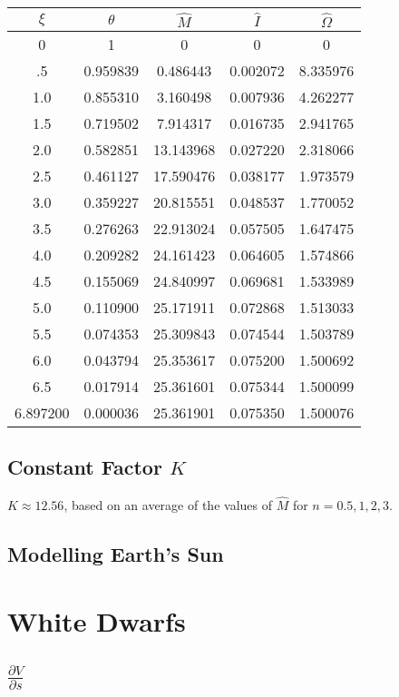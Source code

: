\documentclass[11pt]{article} %
\newcommand{\pder}[2][]{\frac{\partial#1}{\partial#2}}
\begin{document}
\begin{tabular}{| c | c c c c |}
\hline
$\xi$ & $\theta$ & $\hat{M}$ &  $\hat{I}$  & $\hat{\Omega}$ \\
\hline
0 & 1 & 0 & 0 & 0 \\
.5 & 0.959839 & 0.486443 & 0.002072 &8.335976\\
1.0 & 0.855310 & 3.160498 &0.007936 & 4.262277\\
1.5 & 0.719502 & 7.914317 & 0.016735 & 2.941765\\
2.0 &0.582851 &13.143968 &0.027220 & 2.318066\\
2.5 & 0.461127 & 17.590476 &0.038177 & 1.973579\\
3.0 & 0.359227 &20.815551 & 0.048537 & 1.770052\\
3.5 & 0.276263 &22.913024 & 0.057505 & 1.647475\\
4.0 &0.209282 &24.161423 &0.064605 & 1.574866\\
4.5 &0.155069 &24.840997 &0.069681 & 1.533989\\
5.0 & 0.110900 & 25.171911  &0.072868&1.513033\\
5.5 & 0.074353 & 25.309843  &0.074544 &1.503789\\
6.0 &0.043794 &25.353617 &0.075200 & 1.500692\\
6.5 & 0.017914 &25.361601 &0.075344 & 1.500099\\
6.897200 & 0.000036 & 25.361901 & 0.075350 & 1.500076\\
\hline
\end{tabular}


\subsection*{Constant Factor $K$}
$K \approx 12.56$, based on an average of the values of $\hat M$ for $n = 0.5, 1, 2, 3$.
\subsection*{Modelling Earth's Sun}

\section{White Dwarfs}
\subsection*{$\pder[V]{s}$}
\end{document}
